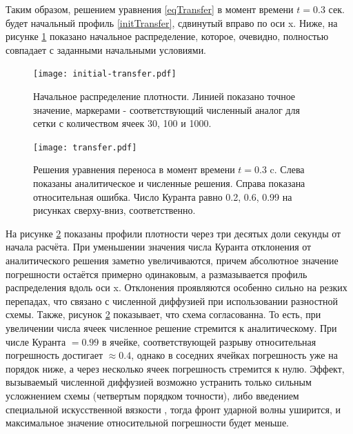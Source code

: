 \documentclass[a4paper]{article}
\begin{document}
	Таким образом, решением уравнения \eqref{eqTransfer} в момент времени $t = 0.3$ сек. будет начальный профиль \eqref{initTransfer}, сдвинутый вправо по оси x. 
	Ниже, на рисунке \ref{initTransferPlot} показано начальное распределение, которое, очевидно, полностью совпадает с заданными начальными условиями. 
	\begin{figure}[h]
		\centering
		\texttt{[image: initial-transfer.pdf]}
		\caption{Начальное распределение плотности. Линией показано точное значение, маркерами - соответствующий численный аналог для сетки с количеством ячеек 30, 100 и 1000.}
		\label{initTransferPlot}
	\end{figure}
	\begin{figure}[!h]
	\centering
	\texttt{[image: transfer.pdf]}
	\caption{Решения уравнения переноса в момент времени $t = 0.3$ c. Слева показаны аналитическое и  численные решения. Справа показана относительная ошибка. Число Куранта равно 0.2, 0.6, 0.99 на рисунках сверху-вниз, соответственно.}
	\label{TransferPlot}
	\end{figure}
	На рисунке \ref{TransferPlot} показаны профили плотности через три десятых доли секунды от начала расчёта. При уменьшении значения числа Куранта отклонения от аналитического решения заметно увеличиваются, причем абсолютное значение погрешности остаётся примерно одинаковым, а размазывается профиль распределения вдоль оси x.
	Отклонения проявляются особенно сильно на резких перепадах, что связано с численной диффузией при использовании разностной схемы. 
	Также, рисунок \ref{TransferPlot} показывает, что схема согласованна. То есть, при увеличении числа ячеек численное решение стремится к аналитическому. 
	При числе Куранта $=0.99$ в ячейке, соответствующей разрыву относительная погрешность достигает $\approx 0.4$, однако в соседних ячейках погрешность уже на порядок ниже, а через несколько ячеек погрешность стремится к нулю. 
	Эффект, вызываемый численной диффузией возможно устранить только сильным усложнением схемы (четвертым порядком точности), либо введением специальной искусственной вязкости \cite{Richtmayer}, тогда фронт ударной волны уширится, и максимальное значение относительной погрешности будет меньше. 
	
	

	
\end{document}
